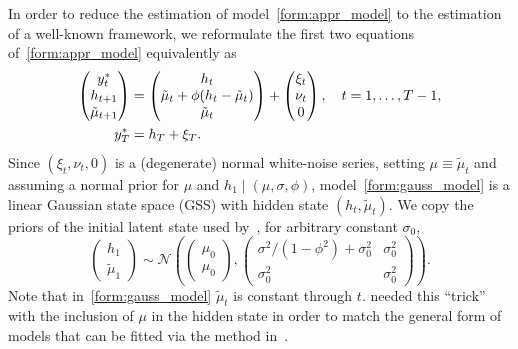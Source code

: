 In order to reduce the estimation of model~\eqref{form:appr_model} to the estimation of a well-known framework, we reformulate the first two equations of~\eqref{form:appr_model} equivalently as
\begin{equation}
\begin{alignedat}{2}\label{form:gauss_model}
\begin{pmatrix}
y_t^\ast \\
h_{t+1} \\
\tilde{\mu}_{t+1}
\end{pmatrix} &=
\begin{pmatrix}
h_t \\
\tilde{\mu}_t+\phi(h_t-\tilde{\mu}_t) \\
\tilde \mu_t
\end{pmatrix} +
\begin{pmatrix}
\xi_t \\
\nu_t \\
0
\end{pmatrix}, \quad t=1,\dots,T-1, \\
y_T^\ast &= h_T+\xi_T.
\end{alignedat}
\end{equation}
Since $(\xi_t,\nu_t,0)$ is a (degenerate) normal white-noise series, setting $\mu\equiv\tilde{\mu}_t$ and assuming a normal prior for $\mu$ and $h_1\mid(\mu,\sigma,\phi)$, model~\eqref{form:gauss_model} is a linear Gaussian state space (GSS) with hidden state $(h_t,\tilde{\mu}_t)$.
We copy the priors of the initial latent state used by~\citet{Omori2007}, for arbitrary constant $\sigma_0$,
\begin{equation*}
\begin{pmatrix}
h_1 \\
\tilde\mu_1
\end{pmatrix} \sim
\mathcal{N}\left(
\begin{pmatrix}
\mu_0 \\
\mu_0
\end{pmatrix},
\begin{pmatrix}
\sigma^2/(1-\phi^2)+\sigma_0^2 & \sigma_0^2 \\
\sigma_0^2 & \sigma_0^2
\end{pmatrix}
\right).
\end{equation*}
Note that in~\eqref{form:gauss_model} $\tilde{\mu}_t$ is constant through $t$. \citet{Omori2007} needed this ``trick'' with the inclusion of $\mu$ in the hidden state in order to match the general form of models that can be fitted via the method in~\citet{de1995simulation}.

